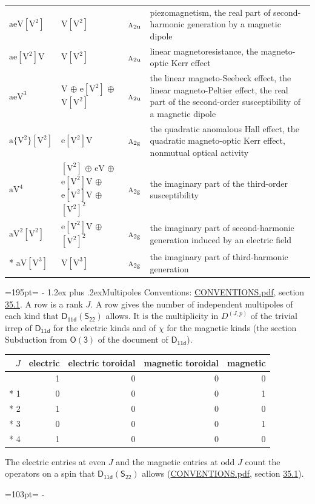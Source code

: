 \documentclass[10pt,a4paper]{article}
\makeatletter
\renewcommand\section{\@startsection{section}{1}{\z@}{-3ex plus -1ex minus -.2ex}%
  {1.2ex plus .2ex}{\normalfont\large\sffamily\bfseries\color{parttitle}}}
\newcommand{\needspace}[1]{\par\penalty-100\begingroup\dimen0=#1\relax\dimen2=\pagegoal
  \advance\dimen2-\pagetotal\ifdim\dimen0>\dimen2\relax\ifdim\dimen2>0pt\vfil\break\fi\fi
  \endgroup}
\numberwithin{equation}{section}
\newcommand{\grp}[1]{\mathsf{#1}}
\newcommand{\irr}[1]{\text{\normalfont\scshape #1}}
\newcommand{\ptag}[1]{\mathrm{#1}}
\newcommand{\irrJp}[2]{D^{(#1,#2)}}
\newcommand{\jahn}[1]{\mathrm{#1}}
\newlength{\fillwidth}\newlength{\cellwidth}\newlength{\colwidth}
\makeatother
\begin{document}
{\begin{longtable}{@{}lll>{\RaggedRight\arraybackslash}p{\fillwidth}@{}}
$\jahn{aeV[V^{2}]}$ & $\jahn{V[V^{2}]}$ & $\irr{a}_{2\ptag{u}}$ & piezomagnetism, the real part of second-harmonic generation by a magnetic dipole\\
$\jahn{ae[V^{2}]V}$ & $\jahn{V[V^{2}]}$ & $\irr{a}_{2\ptag{u}}$ & linear magnetoresistance, the magneto-optic Kerr effect\\
$\jahn{aeV^{3}}$ & $\jahn{V}$ $\oplus$ $\jahn{e[V^{2}]}$ $\oplus$ $\jahn{V[V^{2}]}$ & $\irr{a}_{2\ptag{u}}$ & the linear magneto-Seebeck effect, the linear magneto-Peltier effect, the real part of the second-order susceptibility of a magnetic dipole\\
$\jahn{a\{V^{2}\}[V^{2}]}$ & $\jahn{e[V^{2}]V}$ & $\irr{a}_{2\ptag{g}}$ & the quadratic anomalous Hall effect, the quadratic magneto-optic Kerr effect, nonmutual optical activity\\
$\jahn{aV^{4}}$ & $\jahn{[V^{2}]}$ $\oplus$ $\jahn{eV}$ $\oplus$ $\jahn{e[V^{2}]V}$ $\oplus$ $\jahn{e[V^{2}]V}$ $\oplus$ $\jahn{[V^{2}]^{2}}$ & $\irr{a}_{2\ptag{g}}$ & the imaginary part of the third-order susceptibility\\
$\jahn{aV^{2}[V^{2}]}$ & $\jahn{e[V^{2}]V}$ $\oplus$ $\jahn{[V^{2}]^{2}}$ & $\irr{a}_{2\ptag{g}}$ & the imaginary part of second-harmonic generation induced by an electric field\\*
$\jahn{aV[V^{3}]}$ & $\jahn{V[V^{3}]}$ & $\irr{a}_{2\ptag{g}}$ & the imaginary part of third-harmonic generation\\
\bottomrule\end{longtable}}
\needspace{195pt}
\section{Multipoles}\label{s:multipoles}
Conventions: \href{../../CONVENTIONS.pdf}{CONVENTIONS.pdf}, section \href{../../CONVENTIONS.pdf\#conv.35.1}{35.1}.
A row is a rank $J$. \label{n:head.multipole.electric}\label{n:head.multipole.electric.toroidal}\label{n:head.multipole.magnetic.toroidal}\label{n:head.multipole.magnetic}A row gives the number of independent multipoles of each kind that $\grp{D_{11d}}(\grp{S_{22}})$ allows. It is the multiplicity in $\irrJp{J}{p}$ of the trivial irrep of $\grp{D_{11d}}$ for the electric kinds and of $\chi$ for the magnetic kinds (the section Subduction from $\grp{O(3)}$ of the document of \href{../../../rotation/data/pdf/D11d.pdf}{$\grp{D_{11d}}$}).
{\small\begin{longtable}{@{}rrrrr@{}}\toprule
$J$ & electric & electric toroidal & magnetic toroidal & magnetic\\\midrule\endhead
\bottomrule\endfoot\endlastfoot
0 & 1 & 0 & 0 & 0\\*
1 & 0 & 0 & 0 & 1\\*
2 & 1 & 0 & 0 & 0\\*
3 & 0 & 0 & 0 & 1\\*
4 & 1 & 0 & 0 & 0\\
\bottomrule\end{longtable}}
The electric entries at even $J$ and the magnetic entries at odd $J$ count the operators on a spin that $\grp{D_{11d}}(\grp{S_{22}})$ allows (\href{../../CONVENTIONS.pdf}{CONVENTIONS.pdf}, section \href{../../CONVENTIONS.pdf\#conv.35.1}{35.1}).
\needspace{103pt}
\end{document}
